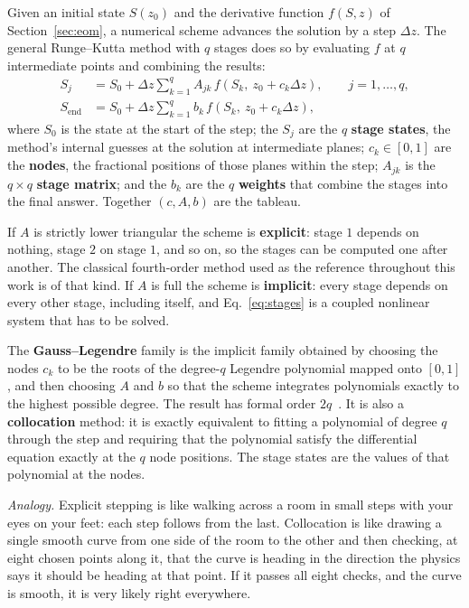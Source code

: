 \documentclass[11pt,a4paper]{article}
\begin{document}
Given an initial state $S(z_0)$ and the derivative function $f(S, z)$ of
Section~\ref{sec:eom}, a numerical scheme advances the solution by a step
$\Delta z$. The general Runge--Kutta method with $q$ stages does so by
evaluating $f$ at $q$ intermediate points and combining the results:
%
\begin{align}
  S_j &= S_0 + \Delta z \sum_{k=1}^{q} A_{jk}\,
         f\!\left(S_k,\ z_0 + c_k \Delta z\right), \qquad j = 1,\dots,q,
  \label{eq:stages}\\
  S_{\mathrm{end}} &= S_0 + \Delta z \sum_{k=1}^{q} b_k\,
         f\!\left(S_k,\ z_0 + c_k \Delta z\right),
  \label{eq:endpoint}
\end{align}
%
where $S_0$ is the state at the start of the step; the $S_j$ are the $q$
\textbf{stage states}, the method's internal guesses at the solution at
intermediate planes; $c_k \in [0,1]$ are the \textbf{nodes}, the fractional
positions of those planes within the step; $A_{jk}$ is the $q \times q$
\textbf{stage matrix}; and the $b_k$ are the $q$ \textbf{weights} that combine
the stages into the final answer. Together $(c, A, b)$ are the tableau.

If $A$ is strictly lower triangular the scheme is \textbf{explicit}: stage $1$
depends on nothing, stage $2$ on stage $1$, and so on, so the stages can be
computed one after another. The classical fourth-order method used as the
reference throughout this work is of that kind. If $A$ is full the scheme is
\textbf{implicit}: every stage depends on every other stage, including itself,
and Eq.~\eqref{eq:stages} is a coupled nonlinear system that has to be solved.

The \textbf{Gauss--Legendre} family is the implicit family obtained by choosing
the nodes $c_k$ to be the roots of the degree-$q$ Legendre polynomial mapped
onto $[0,1]$, and then choosing $A$ and $b$ so that the scheme integrates
polynomials exactly to the highest possible degree. The result has formal order
$2q$~\cite{hairer1996}. It is also a \textbf{collocation} method: it is exactly
equivalent to fitting a polynomial of degree $q$ through the step and requiring
that the polynomial satisfy the differential equation exactly at the $q$ node
positions. The stage states are the values of that polynomial at the nodes.

\emph{Analogy.} Explicit stepping is like walking across a room in small steps
with your eyes on your feet: each step follows from the last. Collocation is
like drawing a single smooth curve from one side of the room to the other and
then checking, at eight chosen points along it, that the curve is heading in the
direction the physics says it should be heading at that point. If it passes all
eight checks, and the curve is smooth, it is very likely right everywhere.
\end{document}
